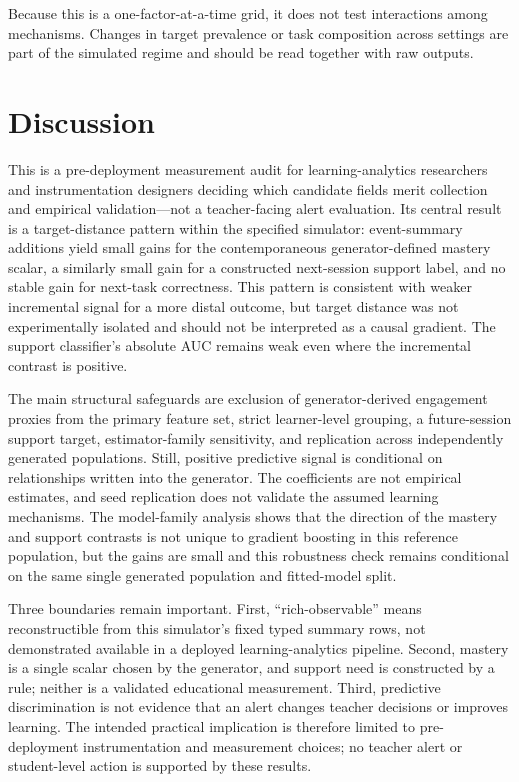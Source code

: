 \documentclass[11pt]{article}
\begin{document}
Because this is a one-factor-at-a-time grid, it does not test interactions among mechanisms. Changes in target prevalence or task composition across settings are part of the simulated regime and should be read together with raw outputs.

\section{Discussion}

This is a pre-deployment measurement audit for learning-analytics researchers and instrumentation designers deciding which candidate fields merit collection and empirical validation—not a teacher-facing alert evaluation. Its central result is a target-distance pattern within the specified simulator: event-summary additions yield small gains for the contemporaneous generator-defined mastery scalar, a similarly small gain for a constructed next-session support label, and no stable gain for next-task correctness. This pattern is consistent with weaker incremental signal for a more distal outcome, but target distance was not experimentally isolated and should not be interpreted as a causal gradient. The support classifier’s absolute AUC remains weak even where the incremental contrast is positive.

The main structural safeguards are exclusion of generator-derived engagement proxies from the primary feature set, strict learner-level grouping, a future-session support target, estimator-family sensitivity, and replication across independently generated populations. Still, positive predictive signal is conditional on relationships written into the generator. The coefficients are not empirical estimates, and seed replication does not validate the assumed learning mechanisms. The model-family analysis shows that the direction of the mastery and support contrasts is not unique to gradient boosting in this reference population, but the gains are small and this robustness check remains conditional on the same single generated population and fitted-model split.

Three boundaries remain important. First, “rich-observable” means reconstructible from this simulator’s fixed typed summary rows, not demonstrated available in a deployed learning-analytics pipeline. Second, mastery is a single scalar chosen by the generator, and support need is constructed by a rule; neither is a validated educational measurement. Third, predictive discrimination is not evidence that an alert changes teacher decisions or improves learning. The intended practical implication is therefore limited to pre-deployment instrumentation and measurement choices; no teacher alert or student-level action is supported by these results.
\end{document}
